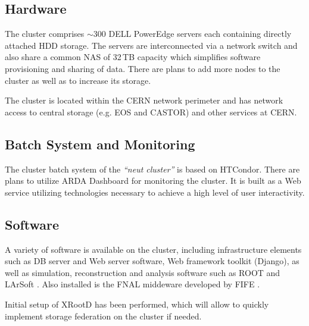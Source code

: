 \documentclass[pdftex,12pt,letter]{article}
\begin{document}
\subsection{Hardware}
The cluster comprises $\sim$300 DELL PowerEdge servers each containing directly attached HDD storage.
The servers are interconnected via a network switch and
also share a common NAS of 32\,TB capacity which simplifies software provisioning and
sharing of data. There are plans to add more nodes to the cluster as well as to increase
its storage.

The cluster is located within the CERN network perimeter and has network access to central
storage (e.g. EOS and CASTOR) and other  services at CERN.

\subsection{Batch System and Monitoring}
The cluster batch system of the \textit{``neut cluster''} is based on HTCondor\cite{htcondor}.
There are plans to utilize ARDA \cite{arda} Dashboard for monitoring the cluster.
 It is built as a Web service utilizing technologies necessary to achieve a high level of user interactivity.

\subsection{Software}
A variety of software is available on the cluster, including infrastructure elements such as DB server and
Web server software, Web framework toolkit (Django), as well as simulation, reconstruction and analysis
software such as ROOT \cite{root} and LArSoft \cite{larsoft}. Also installed is the FNAL middeware developed by FIFE
\cite{fife}.

Initial setup of XRootD\cite{xrootd} has been performed, which will allow to quickly implement storage federation
on the cluster if needed.
\end{document}

